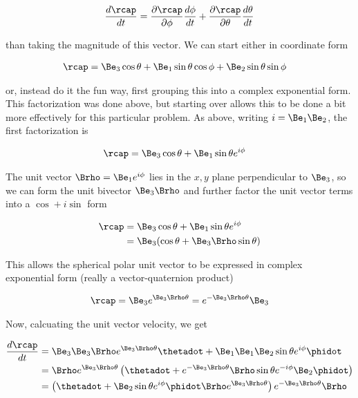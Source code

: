 \begin{align}\label{eqn:sphericalPolarUnit:yoo1a}
\frac{d\rcap}{dt} = \PD{\phi}{\rcap} \frac{d\phi}{dt} 
+\PD{\theta}{\rcap} \frac{d\theta}{dt}
\end{align}

than taking the magnitude of this vector.  We can start either in coordinate form

\begin{align}\label{eqn:sphericalPolarUnit:yoo1}
\rcap 
&= \Be_3 \cos\theta + \Be_1 \sin\theta \cos\phi + \Be_2 \sin\theta \sin\phi
\end{align}

or, instead do it the fun way, first grouping this into a complex exponential form.  This factorization was done above, but starting over allows this to be done a bit more effectively for this particular problem.  As above, writing $i = \Be_1 \Be_2$, the first factorization is

\begin{align}\label{eqn:sphericalPolarUnit:yoo2}
\rcap 
&= \Be_3 \cos\theta + \Be_1 \sin\theta e^{i\phi} 
\end{align}

The unit vector $\Brho = \Be_1 e^{i\phi}$ lies in the $x,y$ plane perpendicular to $\Be_3$, so we can form the unit bivector $\Be_3\Brho$ and further factor the unit vector terms into a $\cos + i \sin$ form

\begin{align*}
\rcap 
&= \Be_3 \cos\theta + \Be_1 \sin\theta e^{i\phi} \\
&= \Be_3 (\cos\theta + \Be_3 \Brho \sin\theta) \\
\end{align*}

This allows the spherical polar unit vector to be expressed in complex exponential form (really a vector-quaternion product)

\begin{align}\label{eqn:sphericalPolarUnit:yoo3}
\rcap = \Be_3 e^{\Be_3 \Brho \theta} = e^{-\Be_3 \Brho \theta} \Be_3
\end{align}

Now, calcuating the unit vector velocity, we get

\begin{align*}
\frac{d\rcap}{dt} 
&= \Be_3 \Be_3 \Brho e^{\Be_3 \Brho \theta} \thetadot + \Be_1 \Be_1 \Be_2 \sin\theta e^{i\phi} \phidot \\
&= \Brho e^{\Be_3 \Brho \theta} \left(\thetadot + e^{-\Be_3 \Brho \theta} \Brho \sin\theta e^{-i\phi} \Be_2 \phidot\right) \\
&= \left( \thetadot + \Be_2 \sin\theta e^{i\phi} \phidot \Brho e^{\Be_3 \Brho \theta} \right) e^{-\Be_3 \Brho \theta} \Brho
\end{align*}

